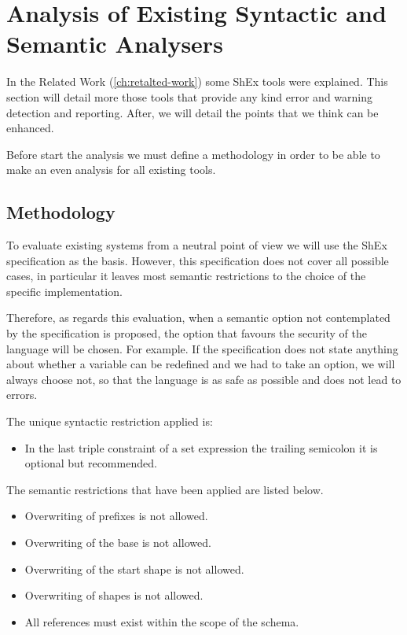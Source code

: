 \chapter{Analysis of Existing Syntactic and Semantic Analysers}
\label{ch:current-analysers-analysis}

In the Related Work (\cref{ch:retalted-work}) some ShEx tools were explained. This section will detail more
those tools that provide any kind error and warning detection and reporting. After, we will detail the points
that we think can be enhanced.

Before start the analysis we must define a methodology in order to be able to make an even analysis for all
existing tools.

\section{Methodology}
To evaluate existing systems from a neutral point of view we will use the ShEx specification as the basis.
However, this specification does not cover all possible cases, in particular it leaves most semantic restrictions
to the choice of the specific implementation.

Therefore, as regards this evaluation, when a semantic option not contemplated by the specification is proposed,
the option that favours the security of the language will be chosen. For example. If the specification does not state
anything about whether a variable can be redefined and we had to take an option, we will always choose not, so that
the language is as safe as possible and does not lead to errors.

The unique syntactic restriction applied is:
\begin{itemize}
  \item In the last triple constraint of a set expression the trailing semicolon it is optional but recommended.
\end{itemize}

The semantic restrictions that have been applied are listed below.
\begin{itemize}
  \item Overwriting of prefixes is not allowed.
  \item Overwriting of the base is not allowed.
  \item Overwriting of the start shape is not allowed.
  \item Overwriting of shapes is not allowed.
  \item All references must exist within the scope of the schema.
\end{itemize}

